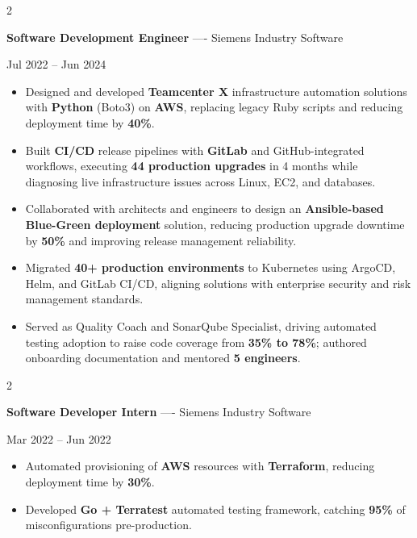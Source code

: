 \documentclass[10pt, letterpaper]{article}
\newenvironment{highlights}{
    \begin{itemize}[
        topsep=0.10 cm,
        parsep=0.06 cm,
        partopsep=0pt,
        itemsep=0.06 cm,
        leftmargin=12pt
    ]
}{
    \end{itemize}
}
\newenvironment{twocolentry}[2][]{
    \onecolentry
    \def\secondColumn{#2}
    \setcolumnwidth{\fill, 4.5 cm}
    \begin{paracol}{2}
}{
    \switchcolumn \raggedleft \secondColumn
    \end{paracol}
    \endonecolentry
}
\begin{document}
\vspace{0.15 cm}

\begin{twocolentry}{Jul 2022 -- Jun 2024}
\textbf{Software Development Engineer} ---- Siemens Industry Software
\end{twocolentry}
\begin{highlights}
  \item Designed and developed \textbf{Teamcenter X} infrastructure automation solutions with \textbf{Python} (Boto3) on \textbf{AWS}, replacing legacy Ruby scripts and reducing deployment time by \textbf{40\%}.
  \item Built \textbf{CI/CD} release pipelines with \textbf{GitLab} and GitHub-integrated workflows, executing \textbf{44 production upgrades} in 4 months while diagnosing live infrastructure issues across Linux, EC2, and databases.
  \item Collaborated with architects and engineers to design an \textbf{Ansible-based Blue-Green deployment} solution, reducing production upgrade downtime by \textbf{50\%} and improving release management reliability.
  \item Migrated \textbf{40+ production environments} to Kubernetes using ArgoCD, Helm, and GitLab CI/CD, aligning solutions with enterprise security and risk management standards.
  \item Served as Quality Coach and SonarQube Specialist, driving automated testing adoption to raise code coverage from \textbf{35\% to 78\%}; authored onboarding documentation and mentored \textbf{5 engineers}.
\end{highlights}

\vspace{0.15 cm}

\begin{twocolentry}{Mar 2022 -- Jun 2022}
\textbf{Software Developer Intern} ---- Siemens Industry Software
\end{twocolentry}
\begin{highlights}
  \item Automated provisioning of \textbf{AWS} resources with \textbf{Terraform}, reducing deployment time by \textbf{30\%}.
  \item Developed \textbf{Go + Terratest} automated testing framework, catching \textbf{95\%} of misconfigurations pre-production.
\end{highlights}

\end{document}
